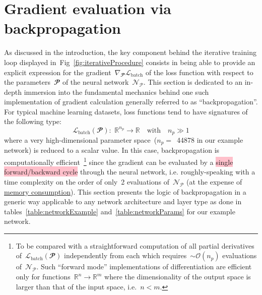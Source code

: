 \documentclass{article}
\begin{document}
\newpage

\section{Gradient evaluation via backpropagation}
\label{backPropSection}

As discussed in the introduction, the key component behind the iterative training loop displayed in~Fig~\ref{fig:iterativeProcedure} consists in being able to provide an explicit expression for the gradient~$\nabla_\mathbfcal{P} \mathcal{L}_\text{batch}$ of the loss function with respect to the parameters~$\mathbfcal{P}$ of the neural network~$\mathcal{N}_\mathcal{P}$.  This section is dedicated to an in-depth immersion into the fundamental mechanics behind one such implementation of gradient calculation generally referred to as ``backpropagation''.   For typical machine learning datasets, loss functions tend to have signatures of the following type:
\begin{equation*}
\mathcal{L}_\text{batch} (\mathbfcal{P}) : \,\, \mathbb{R}^{n_p} \rightarrow \mathbb{R} \quad \text{with} \quad n_p \gg 1
\end{equation*}
where a very high-dimensional parameter space~($n_p =$~\num[group-separator={,}]{44878} in our example network) is reduced to a scalar value.  In this case, backpropagation is computationally efficient~\footnote{\label{backVsForward} To be compared with a straightforward computation of all partial derivatives of~$\mathcal{L}_\text{batch} (\mathbfcal{P})$ independently from each which requires~$\sim \mathcal{O}(n_p)$ evaluations of~$\mathcal{N}_\mathcal{P}$. Such ``forward mode'' implementations of differentiation are efficient only for functions~$\mathbb{R}^n \rightarrow \mathbb{R}^m$ where the dimensionality of the output space is larger than that of the input space, i.e.~$n < m$.} since the gradient can be evaluated by a \colorbox{pink}{single forward/backward cycle} through the neural network, i.e. roughly-speaking with a time complexity on the order of only~2 evaluations of~$\mathcal{N}_\mathcal{P}$ (at the expense of \hyperlink{memBack}{memory consumption}). This section presents the logic of backpropagation in a generic way applicable to any network architecture and layer type as done in tables~\ref{table:networkExample} and~\ref{table:networkParams} for our example network.
\end{document}
